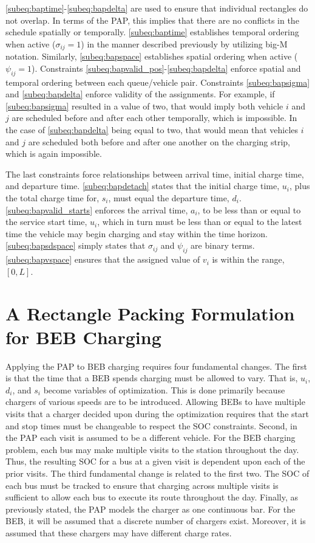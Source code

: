 \documentclass[ee,thesis]{usuthesis}
\begin{document}
\autoref{subeq:baptime}-\autoref{subeq:bapdelta} are used to ensure that individual rectangles do not overlap. In terms
of the PAP, this implies that there are no conflicts in the schedule spatially or temporally. \autoref{subeq:baptime}
establishes temporal ordering when active (\(\sigma_{ij}=1\)) in the manner described previously by utilizing big-M notation.
Similarly, \autoref{subeq:bapspace} establishes spatial ordering when active (\(\psi_{ij} =1\)). Constraints
\autoref{subeq:bapvalid_pos}-\autoref{subeq:bapdelta} enforce spatial and temporal ordering between each queue/vehicle
pair. Constraints \autoref{subeq:bapsigma} and \autoref{subeq:bapdelta} enforce validity of the assignments. For
example, if \autoref{subeq:bapsigma} resulted in a value of two, that would imply both vehicle \(i\) and \(j\) are scheduled
before and after each other temporally, which is impossible. In the case of \autoref{subeq:bapdelta} being equal to
two, that would mean that vehicles \(i\) and \(j\) are scheduled both before and after one another on the charging strip,
which is again impossible.

The last constraints force relationships between arrival time, initial charge time, and departure time.
\autoref{subeq:bapdetach} states that the initial charge time, \(u_i\), plus the total charge time for, \(s_i\), must equal
the departure time, \(d_i\). \autoref{subeq:bapvalid_starts} enforces the arrival time, \(a_i\), to be less than or equal to
the service start time, \(u_i\), which in turn must be less than or equal to the latest time the vehicle may begin
charging and stay within the time horizon. \autoref{subeq:bapsdspace} simply states that \(\sigma_{ij}\) and \(\psi_{ij}\) are
binary terms. \autoref{subeq:bapvspace} ensures that the assigned value of \(v_i\) is within the range, \([0,L]\).

\section{A Rectangle Packing Formulation for BEB Charging}
\label{sec:problemformulation}
Applying the PAP to BEB charging requires four fundamental changes. The first is that the time that a BEB spends
charging must be allowed to vary. That is, \(u_i\), \(d_i\), and \(s_i\) become variables of optimization. This is done
primarily because chargers of various speeds are to be introduced. Allowing BEBs to have multiple visits that a charger
decided upon during the optimization requires that the start and stop times must be changeable to respect the SOC
constraints. Second, in the PAP each visit is assumed to be a different vehicle. For the BEB charging problem, each bus
may make multiple visits to the station throughout the day. Thus, the resulting SOC for a bus at a given visit is
dependent upon each of the prior visits. The third fundamental change is related to the first two. The SOC of each bus
must be tracked to ensure that charging across multiple visits is sufficient to allow each bus to execute its route
throughout the day. Finally, as previously stated, the PAP models the charger as one continuous bar. For the BEB, it
will be assumed that a discrete number of chargers exist. Moreover, it is assumed that these chargers may have different
charge rates.
\end{document}
